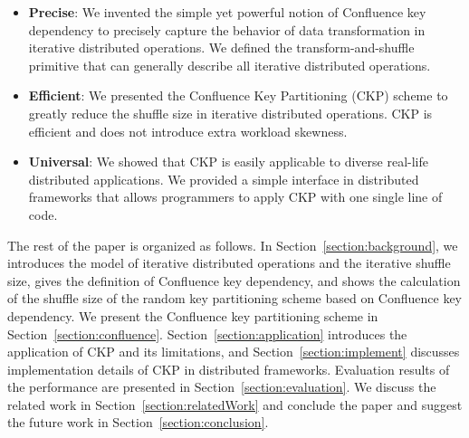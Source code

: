 \documentclass[10pt,journal,compsoc]{IEEEtran}
\begin{document}
\begin{itemize}
\setlength{\itemsep}{0pt}
\setlength{\parskip}{0pt}
\setlength{\parsep}{0pt}
\item \textbf{Precise}: 
We invented the simple yet powerful notion of Confluence key dependency to precisely capture the behavior of data transformation in iterative distributed operations. 
We defined the transform-and-shuffle primitive that can generally describe all iterative distributed operations. 

\item \textbf{Efficient}: We presented the Confluence Key Partitioning (CKP) scheme to 
greatly reduce the shuffle size in iterative distributed operations.
CKP is efficient and does not introduce extra workload skewness. 

\item \textbf{Universal}: We showed that CKP is easily applicable to diverse real-life distributed applications.
We provided a simple interface in distributed frameworks that allows 
programmers to apply CKP with one single line of code.



\end{itemize}


The rest of the paper is organized as follows. 
In Section~\ref{section:background}, 
we introduces the model of iterative distributed operations and the 
iterative shuffle size, gives the definition of Confluence 
key dependency, and shows the calculation of the shuffle size of 
the random key partitioning scheme based on Confluence key dependency.
We present the Confluence key partitioning scheme in Section~\ref{section:confluence}.
Section~\ref{section:application} introduces the application of CKP
and its limitations, 
and Section~\ref{section:implement} discusses 
implementation details of CKP in distributed frameworks.
Evaluation results of the performance are presented in Section~\ref{section:evaluation}. 
We discuss the related work in Section~\ref{section:relatedWork} and
conclude the paper and suggest the future work in
Section~\ref{section:conclusion}.
\end{document}
